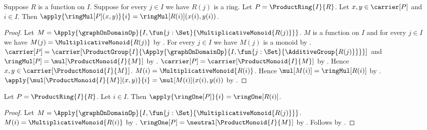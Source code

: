 \begin{proposition}\label{product_ring_mul_coordinate}
    Suppose $R$ is a function on $I$.
    Suppose for every $j\in I$ we have $R(j)$ is a ring.
    Let $P=\ProductRing{I}{R}$.
    Let $x,y\in\carrier[P]$ and $i\in I$.
    Then
        $\apply{\ringMul[P](x,y)}{i}
            =\ringMul[R(i)](x(i),y(i))$.
\end{proposition}
\begin{proof}
    Let $M=\Apply{\graphOnDomainOp}{
        I,\fun{j:\Set}{\MultiplicativeMonoid{R(j)}}}$.
    $M$ is a function on $I$ and for every $j\in I$ we have
        $M(j)=\MultiplicativeMonoid{R(j)}$ by
        .
    For every $j\in I$ we have $M(j)$ is a monoid by
        .
    $\carrier[P]=\carrier[\ProductGroup{I}{
        \Apply{\graphOnDomainOp}{
            I,\fun{j:\Set}{\AdditiveGroup{R(j)}}}}]$ and
        $\ringMul[P]=\mul[\ProductMonoid{I}{M}]$ by
        .
    $\carrier[P]=\carrier[\ProductMonoid{I}{M}]$ by
        .
    Hence $x,y\in\carrier[\ProductMonoid{I}{M}]$.
    $M(i)=\MultiplicativeMonoid{R(i)}$.
    Hence $\mul[M(i)]=\ringMul[R(i)]$ by
        .
    $\apply{\mul[\ProductMonoid{I}{M}](x,y)}{i}
        =\mul[M(i)](x(i),y(i))$ by
        .
\end{proof}

\begin{proposition}\label{product_ring_one_coordinate}
    Let $P=\ProductRing{I}{R}$.
    Let $i\in I$.
    Then $\apply{\ringOne[P]}{i}=\ringOne[R(i)]$.
\end{proposition}
\begin{proof}
    Let $M=\Apply{\graphOnDomainOp}{
        I,\fun{j:\Set}{\MultiplicativeMonoid{R(j)}}}$.
    $M(i)=\MultiplicativeMonoid{R(i)}$ by
        .
    $\ringOne[P]=\neutral[\ProductMonoid{I}{M}]$ by
        .
    Follows by
        .
\end{proof}

